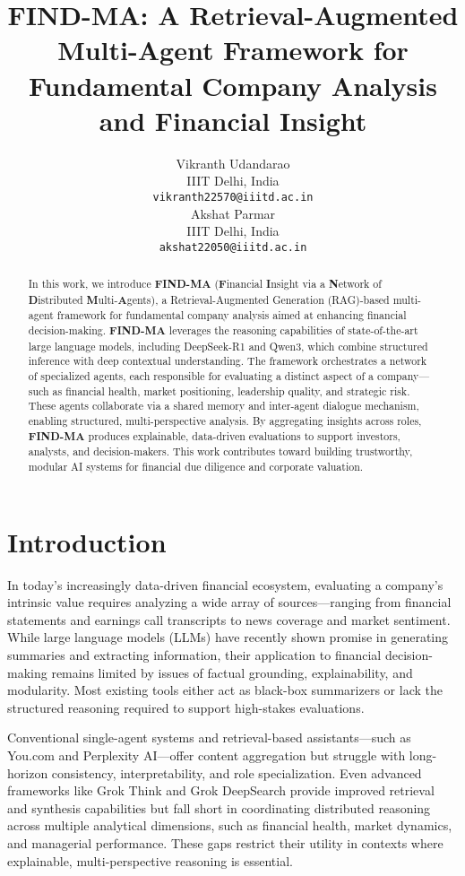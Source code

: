 \documentclass[11pt]{article}
\title{FIND-MA: A Retrieval-Augmented Multi-Agent Framework for Fundamental Company Analysis and Financial Insight}
\author{Vikranth Udandarao \\
  IIIT Delhi, India \\
  \texttt{vikranth22570@iiitd.ac.in} \\\And
  Akshat Parmar \\
  IIIT Delhi, India \\
  \texttt{akshat22050@iiitd.ac.in}}
\begin{document}
\maketitle
\begin{abstract}
In this work, we introduce \textbf{FIND-MA} (\textbf{F}inancial \textbf{I}nsight via a \textbf{N}etwork of \textbf{D}istributed \textbf{M}ulti-\textbf{A}gents), a Retrieval-Augmented Generation (RAG)-based multi-agent framework for fundamental company analysis aimed at enhancing financial decision-making. \textbf{FIND-MA} leverages the reasoning capabilities of state-of-the-art large language models, including DeepSeek-R1 and Qwen3, which combine structured inference with deep contextual understanding. The framework orchestrates a network of specialized agents, each responsible for evaluating a distinct aspect of a company—such as financial health, market positioning, leadership quality, and strategic risk. These agents collaborate via a shared memory and inter-agent dialogue mechanism, enabling structured, multi-perspective analysis. By aggregating insights across roles, \textbf{FIND-MA} produces explainable, data-driven evaluations to support investors, analysts, and decision-makers. This work contributes toward building trustworthy, modular AI systems for financial due diligence and corporate valuation.
\end{abstract}





\section{Introduction}
\label{sec:intro}

In today’s increasingly data-driven financial ecosystem, evaluating a company’s intrinsic value requires analyzing a wide array of sources—ranging from financial statements and earnings call transcripts to news coverage and market sentiment. While large language models (LLMs) have recently shown promise in generating summaries and extracting information, their application to financial decision-making remains limited by issues of factual grounding, explainability, and modularity. Most existing tools either act as black-box summarizers or lack the structured reasoning required to support high-stakes evaluations.

Conventional single-agent systems and retrieval-based assistants—such as You.com and Perplexity AI—offer content aggregation but struggle with long-horizon consistency, interpretability, and role specialization. Even advanced frameworks like Grok Think and Grok DeepSearch provide improved retrieval and synthesis capabilities but fall short in coordinating distributed reasoning across multiple analytical dimensions, such as financial health, market dynamics, and managerial performance. These gaps restrict their utility in contexts where explainable, multi-perspective reasoning is essential.
\end{document}
